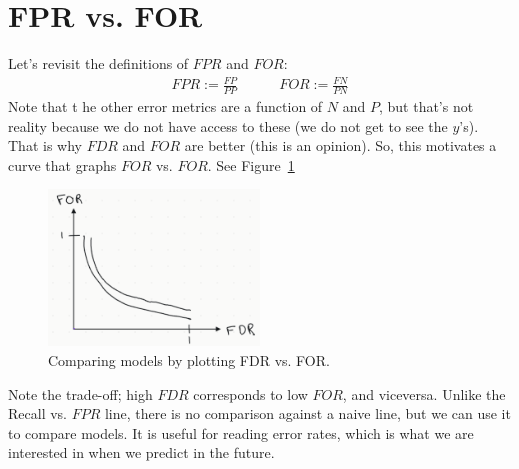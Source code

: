 \documentclass[12pt, a4paper]{article}
\theoremstyle{definition}
\begin{document}
	\section{FPR vs. FOR}
	Let's revisit the definitions of $FPR$ and $FOR$:
	\begin{align*}
		FPR := \frac{FP}{PP} \quad\quad\quad FOR := \frac{FN}{PN}
	\end{align*}
	Note that t he other error metrics are a function of $N$ and $P$,
	but that's not reality because we do not have access to these
	(we do not get to see the $y$'s). That is why $FDR$ and $FOR$
	are better (this is an opinion). So, this motivates a curve that graphs
	$FOR$ vs. $FOR$. See Figure~\ref{fig:fdr-vs-for}
	\begin{figure}
		\centering
		\includegraphics[width=0.5\textwidth]{fdr-vs-for}
		\caption{Comparing models by plotting FDR vs. FOR.}
		\label{fig:fdr-vs-for}
	\end{figure}
	Note the trade-off; high $FDR$ corresponds to low $FOR$, and viceversa.
	Unlike the Recall vs. $FPR$ line, there is no comparison against a
	naive line, but we can use it to compare models. It is useful for
	reading error rates, which is what we are interested in when we predict
	in the future.
\end{document}
